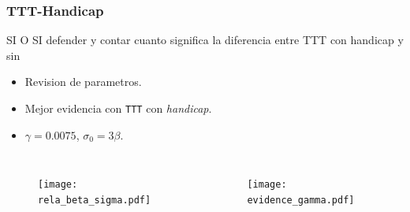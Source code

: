 \documentclass{beamer}
\begin{document}
\begin{frame}
\frametitle{TTT-Handicap}
SI O SI defender y contar cuanto significa la diferencia entre TTT con handicap y sin
    \begin{itemize}
     \item Revision de parametros.
     \item Mejor evidencia con \texttt{TTT} con \emph{handicap}.
     \item $\gamma=0.0075$, $\sigma_0=3\beta$.
    \end{itemize}
\begin{columns}

       \begin{figure}[H]
        \centering
        \texttt{[image: rela\_beta\_sigma.pdf]}
    \end{figure}

 
  \begin{figure}[H]
        \centering
        \texttt{[image: evidence\_gamma.pdf]}
    \end{figure}
\end{columns}


\end{frame}
\end{document}
